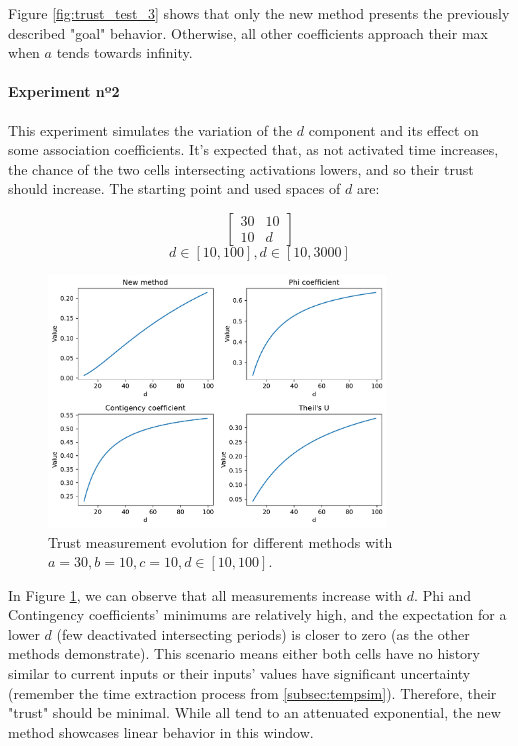 Figure \ref{fig:trust_test_3} shows that only the new method presents the previously described "goal" behavior. Otherwise, all other coefficients approach their max when $a$ tends towards infinity.

\paragraph{Experiment nº2}

This experiment simulates the variation of the $d$ component and its effect on some association coefficients. It's expected that, as not activated time increases, the chance of the two cells intersecting activations lowers, and so their trust should increase. The starting point and used spaces of $d$ are:

$$
\begin{bmatrix}
    30 & 10 \\ 10 & d
\end{bmatrix}
$$
$$
d \in [10, 100], d \in [10, 3000]
$$

\begin{figure}[h!]
\centering
    \includegraphics[width=0.8\textwidth]{figures/chapter4/cell/trust_tests/1_a.pdf}
    \caption{Trust measurement evolution for different methods with $a=30, b=10, c=10, d \in [10, 100]$.}
    \label{fig:trust_test_1_a}
\end{figure}
\FloatBarrier


In Figure \ref{fig:trust_test_1_a}, we can observe that all measurements increase with $d$. Phi and Contingency coefficients' minimums are relatively high, and the expectation for a lower $d$ (few deactivated intersecting periods) is closer to zero (as the other methods demonstrate). This scenario means either both cells have no history similar to current inputs or their inputs' values have significant uncertainty (remember the time extraction process from \ref{subsec:tempsim}). Therefore, their "trust" should be minimal. While all tend to an attenuated exponential, the new method showcases linear behavior in this window.

